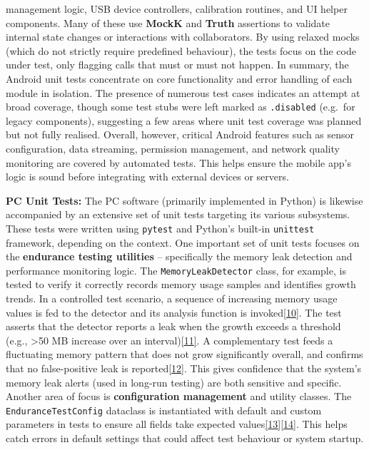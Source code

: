 \documentclass[12pt,a4paper]{article}
\begin{document}
management logic, USB device controllers, calibration routines, and UI helper components. Many of these use \textbf{MockK} and \textbf{Truth} assertions to validate internal state changes or interactions with collaborators. By using relaxed mocks (which do not strictly require predefined behaviour), the tests focus on the code under test, only flagging calls that must or must not happen. In summary, the Android unit tests concentrate on core functionality and error handling of each module in isolation. The presence of numerous test cases indicates an attempt at broad coverage, though some test stubs were left marked as \passthrough{\lstinline!.disabled!} (e.g.~for legacy components), suggesting a few areas where unit test coverage was planned but not fully realised. Overall, however, critical Android features such as sensor configuration, data streaming, permission management, and network quality monitoring are covered by automated tests. This helps ensure the mobile app's logic is sound before integrating with external devices or servers.

\textbf{PC Unit Tests:} The PC software (primarily implemented in Python) is likewise accompanied by an extensive set of unit tests targeting its various subsystems. These tests were written using \passthrough{\lstinline!pytest!} and Python's built-in \passthrough{\lstinline!unittest!} framework, depending on the context. One important set of unit tests focuses on the \textbf{endurance testing utilities} -- specifically the memory leak detection and performance monitoring logic. The \passthrough{\lstinline!MemoryLeakDetector!} class, for example, is tested to verify it correctly records memory usage samples and identifies growth trends. In a controlled test scenario, a sequence of increasing memory usage values is fed to the detector and its analysis function is invoked\href{https://github.com/buccancs/bucika_gsr/blob/7048f7f6a7536f5cd577ed2184800d3dad97fd08/tests/test_endurance_testing.py\#L50-L59}{{[}10{]}}. The test asserts that the detector reports a leak when the growth exceeds a threshold (e.g., \textgreater50 MB increase over an interval)\href{https://github.com/buccancs/bucika_gsr/blob/7048f7f6a7536f5cd577ed2184800d3dad97fd08/tests/test_endurance_testing.py\#L54-L62}{{[}11{]}}. A complementary test feeds a fluctuating memory pattern that does not grow significantly overall, and confirms that no false-positive leak is reported\href{https://github.com/buccancs/bucika_gsr/blob/7048f7f6a7536f5cd577ed2184800d3dad97fd08/tests/test_endurance_testing.py\#L62-L70}{{[}12{]}}. This gives confidence that the system's memory leak alerts (used in long-run testing) are both sensitive and specific. Another area of focus is \textbf{configuration management} and utility classes. The \passthrough{\lstinline!EnduranceTestConfig!} dataclass is instantiated with default and custom parameters in tests to ensure all fields take expected values\href{https://github.com/buccancs/bucika_gsr/blob/7048f7f6a7536f5cd577ed2184800d3dad97fd08/tests/test_endurance_testing.py\#L76-L84}{{[}13{]}}\href{https://github.com/buccancs/bucika_gsr/blob/7048f7f6a7536f5cd577ed2184800d3dad97fd08/tests/test_endurance_testing.py\#L86-L94}{{[}14{]}}. This helps catch errors in default settings that could affect test behaviour or system startup.
\end{document}

